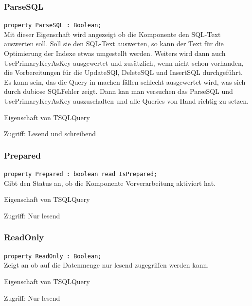 \subsubsection{ParseSQL}\label{ParseSQL}
\begin{description}
  \item \texttt{property ParseSQL : Boolean;}\\Mit dieser Eigenschaft wird angezeigt ob die Komponente den SQL-Text auswerten soll. Soll sie den SQL-Text auswerten, so kann der Text für die Optimierung der Indexe etwas umgestellt werden. Weiters wird dann auch UsePrimaryKeyAsKey ausgewertet und zusätzlich, wenn nicht schon vorhanden, die Vorbereitungen für die UpdateSQl, DeleteSQL und InsertSQL durchgeführt. Es kann sein, das die Query in machen fällen schlecht ausgewertet wird, was sich durch dubiose SQLFehler zeigt. Dann kan man versuchen das ParseSQL und UsePrimaryKeyAsKey auszuschalten und alle Queries von Hand richtig zu setzen.   
  \begin{description}
    \item Eigenschaft von TSQLQuery
  \end{description}
  \begin{description}
    \item Zugriff: Lesend und schreibend
  \end{description}
\end{description}

\subsubsection{Prepared}
\begin{description}
  \item \texttt{property Prepared : boolean read IsPrepared;}\\Gibt den Status an, ob die Komponente Vorverarbeitung aktiviert hat.
  \begin{description}
    \item Eigenschaft von TSQLQuery
  \end{description}
  \begin{description}
    \item Zugriff: Nur lesend
  \end{description}
\end{description}

\subsubsection{ReadOnly}
\begin{description}
  \item \texttt{property ReadOnly : Boolean;}\\Zeigt an ob auf die Datenmenge nur lesend zugegriffen werden kann.
  \begin{description}
    \item Eigenschaft von TSQLQuery
  \end{description}
  \begin{description}
    \item Zugriff: Nur lesend
  \end{description}
\end{description}

